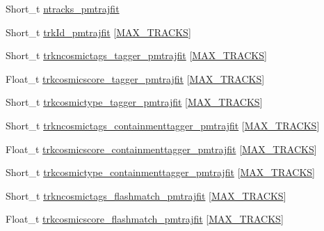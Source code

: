 \begin{DoxyCompactItemize}
\item 
Short\-\_\-t \hyperlink{classanatree_a599451e03494f8dd8e157c5d78ddd6e2}{ntracks\-\_\-pmtrajfit}
\item 
Short\-\_\-t \hyperlink{classanatree_a458e0b93db2bd382d4d6ee451fd332e8}{trk\-Id\-\_\-pmtrajfit} \mbox{[}\hyperlink{anatree__core__v09410002_8h_a327fd4e796e4a0d78947524c96e4362e}{M\-A\-X\-\_\-\-T\-R\-A\-C\-K\-S}\mbox{]}
\item 
Short\-\_\-t \hyperlink{classanatree_a0b0cb717611cbc15d4f5758e3949d410}{trkncosmictags\-\_\-tagger\-\_\-pmtrajfit} \mbox{[}\hyperlink{anatree__core__v09410002_8h_a327fd4e796e4a0d78947524c96e4362e}{M\-A\-X\-\_\-\-T\-R\-A\-C\-K\-S}\mbox{]}
\item 
Float\-\_\-t \hyperlink{classanatree_a63d3c200d7638641c0a242f46a910dd0}{trkcosmicscore\-\_\-tagger\-\_\-pmtrajfit} \mbox{[}\hyperlink{anatree__core__v09410002_8h_a327fd4e796e4a0d78947524c96e4362e}{M\-A\-X\-\_\-\-T\-R\-A\-C\-K\-S}\mbox{]}
\item 
Short\-\_\-t \hyperlink{classanatree_a3a0d3b5fb1121118014b0d2a8387ba6a}{trkcosmictype\-\_\-tagger\-\_\-pmtrajfit} \mbox{[}\hyperlink{anatree__core__v09410002_8h_a327fd4e796e4a0d78947524c96e4362e}{M\-A\-X\-\_\-\-T\-R\-A\-C\-K\-S}\mbox{]}
\item 
Short\-\_\-t \hyperlink{classanatree_a945d06e2aea5a57ae7600e817bc63d0f}{trkncosmictags\-\_\-containmenttagger\-\_\-pmtrajfit} \mbox{[}\hyperlink{anatree__core__v09410002_8h_a327fd4e796e4a0d78947524c96e4362e}{M\-A\-X\-\_\-\-T\-R\-A\-C\-K\-S}\mbox{]}
\item 
Float\-\_\-t \hyperlink{classanatree_a6ee81f915805ae5633a43b086caae9f2}{trkcosmicscore\-\_\-containmenttagger\-\_\-pmtrajfit} \mbox{[}\hyperlink{anatree__core__v09410002_8h_a327fd4e796e4a0d78947524c96e4362e}{M\-A\-X\-\_\-\-T\-R\-A\-C\-K\-S}\mbox{]}
\item 
Short\-\_\-t \hyperlink{classanatree_a7d9cde811e1a0d9d10fa4ac1994c0bdc}{trkcosmictype\-\_\-containmenttagger\-\_\-pmtrajfit} \mbox{[}\hyperlink{anatree__core__v09410002_8h_a327fd4e796e4a0d78947524c96e4362e}{M\-A\-X\-\_\-\-T\-R\-A\-C\-K\-S}\mbox{]}
\item 
Short\-\_\-t \hyperlink{classanatree_ae7727401f92f393835e0334fc0850c92}{trkncosmictags\-\_\-flashmatch\-\_\-pmtrajfit} \mbox{[}\hyperlink{anatree__core__v09410002_8h_a327fd4e796e4a0d78947524c96e4362e}{M\-A\-X\-\_\-\-T\-R\-A\-C\-K\-S}\mbox{]}
\item 
Float\-\_\-t \hyperlink{classanatree_aecde2939d264e5639b7c8e42c8a16a1c}{trkcosmicscore\-\_\-flashmatch\-\_\-pmtrajfit} \mbox{[}\hyperlink{anatree__core__v09410002_8h_a327fd4e796e4a0d78947524c96e4362e}{M\-A\-X\-\_\-\-T\-R\-A\-C\-K\-S}\mbox{]}

\end{DoxyCompactItemize}
